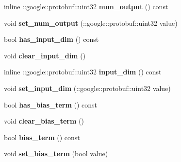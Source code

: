 \begin{DoxyCompactItemize}
\mbox{\label{classcaffe_1_1_embed_parameter_ab705da78a4a40a94deb873324a42b3b4}} 
inline \+::google\+::protobuf\+::uint32 {\bfseries num\+\_\+output} () const
\item 
\mbox{\label{classcaffe_1_1_embed_parameter_a0debd9af4a8e2084e0198c6897b9e520}} 
void {\bfseries set\+\_\+num\+\_\+output} (\+::google\+::protobuf\+::uint32 value)
\item 
\mbox{\label{classcaffe_1_1_embed_parameter_a1c2996a655b140101a64e9e7aebe2b83}} 
bool {\bfseries has\+\_\+input\+\_\+dim} () const
\item 
\mbox{\label{classcaffe_1_1_embed_parameter_ab1a4f02f1c4f1df96e10fbd600108a60}} 
void {\bfseries clear\+\_\+input\+\_\+dim} ()
\item 
\mbox{\label{classcaffe_1_1_embed_parameter_ae7b1112d9846a83304d3fb5298ab337f}} 
inline \+::google\+::protobuf\+::uint32 {\bfseries input\+\_\+dim} () const
\item 
\mbox{\label{classcaffe_1_1_embed_parameter_a0149bfd98482f2b0024b9dd61864129f}} 
void {\bfseries set\+\_\+input\+\_\+dim} (\+::google\+::protobuf\+::uint32 value)
\item 
\mbox{\label{classcaffe_1_1_embed_parameter_a4cfd09bf37df87cbb6e564f872313028}} 
bool {\bfseries has\+\_\+bias\+\_\+term} () const
\item 
\mbox{\label{classcaffe_1_1_embed_parameter_ab30cd8af95969a5dc8f99fc58aacce3b}} 
void {\bfseries clear\+\_\+bias\+\_\+term} ()
\item 
\mbox{\label{classcaffe_1_1_embed_parameter_a3697b3cdd922019a61b2c89dc1593bf0}} 
bool {\bfseries bias\+\_\+term} () const
\item 
\mbox{\label{classcaffe_1_1_embed_parameter_a643c2dc38fb596f08f0ccfa154b4939f}} 
void {\bfseries set\+\_\+bias\+\_\+term} (bool value)

\end{DoxyCompactItemize}
